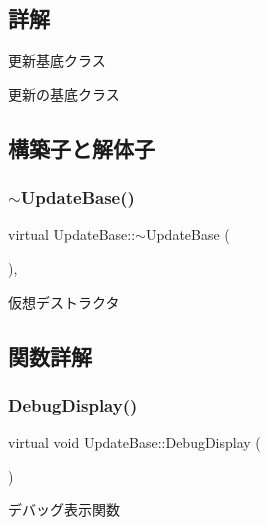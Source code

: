 \subsection{詳解}
更新基底クラス 

更新の基底クラス 

\subsection{構築子と解体子}
\mbox{\label{class_update_base_aad4c3e15c4b67871a0fe13c9f85e5918}} 
\subsubsection{\texorpdfstring{$\sim$\+Update\+Base()}{~UpdateBase()}}
{\footnotesize\ttfamily virtual Update\+Base\+::$\sim$\+Update\+Base (\begin{DoxyParamCaption}{ }\end{DoxyParamCaption})\hspace{0.3cm}{\ttfamily [inline]}, {\ttfamily [virtual]}}



仮想デストラクタ 



\subsection{関数詳解}
\mbox{\label{class_update_base_a5c63c3c3ef1b85f3701718ec3f7b39e2}} 
\subsubsection{\texorpdfstring{Debug\+Display()}{DebugDisplay()}}
{\footnotesize\ttfamily virtual void Update\+Base\+::\+Debug\+Display (\begin{DoxyParamCaption}{ }\end{DoxyParamCaption})\hspace{0.3cm}{\ttfamily [pure virtual]}}



デバッグ表示関数 



